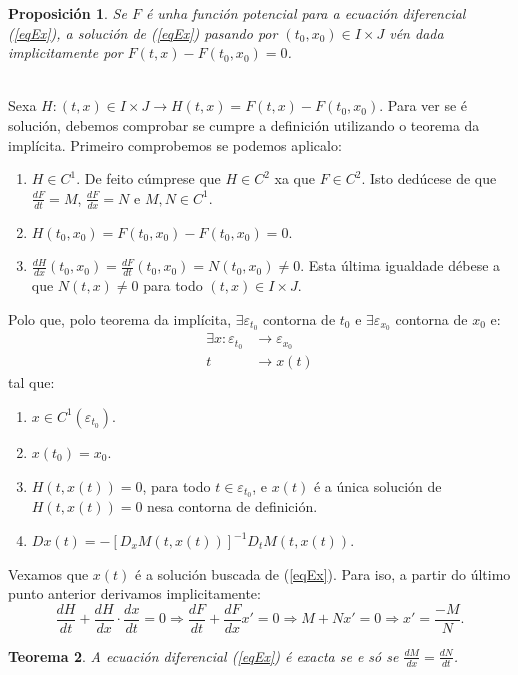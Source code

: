 \documentclass[11pt, a4paper,twoside]{article}
\makeatletter
\theoremstyle{theorem-style}  %
\newtheorem{theorem}{Teorema}[section]  %
\newtheorem{proposition}[theorem]{Proposición}
\renewenvironment{proof}[1][\proofname]{\par
	\pushQED{\qed}%
	\normalfont \topsep6\p@\@plus6\p@\relax
	\list{}{%
		\settowidth{\leftmargin}{\quad:\hskip\labelsep}%
		\setlength{\labelwidth}{0pt}%
		\setlength{\itemindent}{-\leftmargin}%
	}%
	\item[\hskip\labelsep\itshape#1\@addpunct{:}]\ignorespaces
}{%
	\popQED\endlist\@endpefalse
}
\theoremstyle{definition-style}
\theoremstyle{example-style}
\makeatother
\begin{document}
\begin{proposition} \label{sol_exacta}
	Se $F$ é unha función potencial para a ecuación diferencial (\ref{eqEx}), a solución de (\ref{eqEx}) pasando por $(t_0, x_0) \in I \times J$ vén dada implicitamente por $F(t, x) - F(t_0, x_0) = 0$.
\end{proposition}	
\begin{proof}\ \\
	Sexa $H:(t, x) \in I \times J \longrightarrow H(t, x) = F(t, x) - F(t_0, x_0)$. Para ver se é solución, debemos comprobar se cumpre  a definición utilizando o teorema da implícita. Primeiro comprobemos se podemos aplicalo:
	\begin{enumerate}
		\item $H \in C^1$. De feito cúmprese que $ H\in C^2 $ xa que $F \in C^2$. Isto dedúcese de que $\frac{dF}{dt} = M$, $\frac{dF}{dx} = N$ e $M, N \in C^1$.
		\item $H(t_0, x_0) = F(t_0, x_0) - F(t_0, x_0) = 0$.
		\item $\frac{dH}{dx}(t_0, x_0) = \frac{dF}{dt}(t_0, x_0) = N(t_0, x_0) \neq 0$. Esta última igualdade débese a que $N(t, x) \neq 0$ para todo $(t, x) \in I \times J$.
	\end{enumerate} 
	Polo que, polo teorema da implícita, $\exists \varepsilon_{t_0}$ contorna de $t_0$ e $\exists \varepsilon_{x_0}$ contorna de $x_0$ e:
	\begin{align*}
		\exists x : \varepsilon_{t_0} & \longrightarrow \varepsilon_{x_0} \\
		t & \longrightarrow x(t)
	\end{align*}
	tal que:
	\begin{enumerate}
		\item $x \in C^1(\varepsilon_{t_0})$.
		\item $x(t_0) = x_0$.
		\item $H(t, x(t)) = 0$, para todo $ t\in \varepsilon_{t_0} $, e $x(t)$ é a única solución de $H(t, x(t)) = 0$ nesa contorna de definición.
		\item $ D x(t)=-[D_x M(t,x(t))]^{-1}D_tM(t,x(t))$.
	\end{enumerate}
	Vexamos que $x(t)$ é a solución buscada de (\ref{eqEx}). Para iso, a partir do último punto anterior derivamos implicitamente:
	\[\frac{dH}{dt} + \frac{dH}{dx} \cdot \frac{dx}{dt} = 0 \Rightarrow \frac{dF}{dt} + \frac{dF}{dx}x' = 0 \Rightarrow M + Nx' = 0 \Rightarrow x' = \frac{-M}{N}.\]
\end{proof}
\begin{theorem}
	A ecuación diferencial (\ref{eqEx}) é exacta se e só se $\frac{dM}{dx} = \frac{dN}{dt}$.
\end{theorem}
\end{document}
